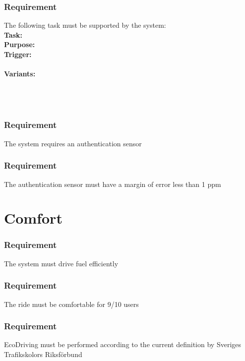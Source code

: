 \documentclass{article}
\begin{document}
{\subsubsection {Requirement}
\hfill \break 
\- \- \-The following task must be supported by the system:\\
\hfill \break 
\textbf{Task:} \\
\textbf{Purpose:} \\
\textbf{Trigger:} \\
\\
\noindent
\textbf{Variants:}     \\
\tab{ }  \\
\tab{ }  \\
\tab{ }  \\
\tab{ }   
\bigskip

    \subsubsection{Requirement}
\hfill \break 
\- \- \-The system requires an authentication sensor
    \subsubsection{Requirement}
\hfill \break 
\- \- \-The authentication sensor must have a margin of error less than 1 ppm


\section{Comfort}
    \subsubsection{Requirement}
\hfill \break 
\- \- \-The system must drive fuel efficiently
    \subsubsection{Requirement}
\hfill \break 
\- \- \-The ride must be comfortable for 9/10 users
    \subsubsection{Requirement}
\hfill \break 
\- \- \-EcoDriving must be performed according to the current definition by Sveriges Trafikskolors Riksförbund


}
\end{document}
